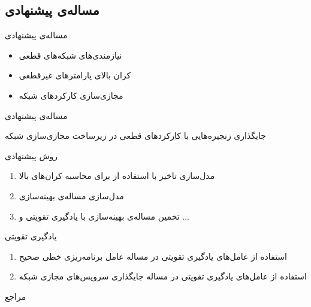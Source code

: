 \documentclass[dvipsnames]{beamer}
\makeatletter
\newcommand{\RTList}{\raggedleft\rightskip\@totalleftmargin}
\makeatother
\begin{document}
\begin{persian}
	\section{مساله‌ی پیشنهادی}

	\begin{frame}{مساله‌ی پیشنهادی}
		\begin{itemize}\RTList{}
				\justifying%
				\item نیازمندی‌های شبکه‌های قطعی
				\item کران بالای پارامترهای غیرقطعی
				\item مجازی‌سازی کارکردهای شبکه
		\end{itemize}
	\end{frame}

	\begin{frame}{مساله‌ی پیشنهادی}
		\begin{block}{}
			\centering
			جایگذاری زنجیره‌هایی با کارکردهای قطعی در زیرساخت مجازی‌سازی شبکه
		\end{block}
	\end{frame}

	\begin{frame}{روش‌ پیشنهادی}
		\begin{enumerate}\RTList{}
				\justifying%
				\item مدل‌سازی تاخیر با استفاده از  برای محاسبه کران‌های بالا
				\item مدل‌سازی مساله‌ی بهینه‌سازی
				\item تخمین مساله‌ی بهینه‌سازی با یادگیری تقویتی و ...
		\end{enumerate}
	\end{frame}

	\begin{frame}{یادگیری تقویتی}
		\begin{enumerate}\RTList{}
				\justifying%
				\item استفاده از عامل‌های یادگیری تقویتی در مساله عامل برنامه‌ریزی خطی صحیح
				\begin{latin}
				\scriptsize{}
				\end{latin}
				\item استفاده از عامل‌های یادگیری تقویتی در مساله جایگذاری سرویس‌های مجازی شبکه
		\end{enumerate}
	\end{frame}

	\begin{frame}[allowframebreaks]{مراجع}
		\begin{latin}
		\printbibliography[title=مراجع]
		\end{latin}
	\end{frame}

\end{persian}
\end{document}
